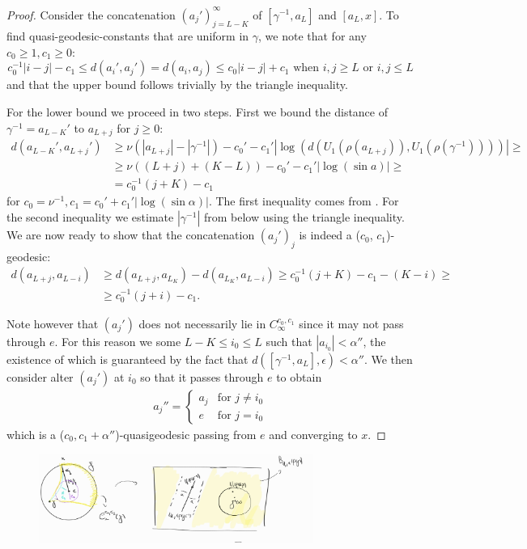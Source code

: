 \documentclass{report}
\begin{document}
\begin{proof}
    Consider the concatenation $(a_j')_{j=L-K}^\infty$ of $[\gamma^{-1},a_L]$ and $[a_L, x]$.
    To find quasi-geodesic-constants that are uniform in $\gamma$, we note that for any $c_0 \geq 1, c_1 \geq 0$:
    \[
        c_0^{-1} |i - j| - c_1 \leq d(a_i', a_j') = d(a_i, a_j) \leq c_0 |i - j| + c_1 
        \text{ when } i,j \geq L \text{ or } i,j \leq L
    \]
    and that the upper bound follows trivially by the triangle inequality. 
    
    For the lower bound we proceed in two steps. 
    First we bound the distance of $\gamma^{-1} = a_{L-K}'$ to $a_{L+j}$ for $j\geq 0$:
    \begin{align*}
        d(a_{L-K}', a_{L+j}') 
        &\geq \nu (|a_{L+j}| - |\gamma^{-1}|) - c_0' -c_1'|\log(d(U_1(\rho(a_{L+j})), U_1(\rho(\gamma^{-1}))))| \geq\\
        &\geq \nu((L+j) + (K-L)) - c_0' -c_1'|\log(\sin a)| \geq\\
        &= c_0^{-1} (j+K) - c_1
    \end{align*}
    for $c_0 = \nu^{-1}, c_1 = c_0' + c_1'|\log(\sin \alpha)|$.
    The first inequality comes from \cite[Lemma 3.9]{pozzetti_anosov_2023}. For the second inequality we estimate $|\gamma^{-1}|$ from below using the triangle inequality.
    We are now ready to show that the concatenation $(a_j')_j$ is indeed a ($c_0$, $c_1$)-geodesic:
    \begin{align*}
        d(a_{L+j}, a_{L-i}) &\geq d(a_{L+j},a_{L_K}) - d(a_{L_K}, a_{L-i}) \geq
        c_0^{-1} (j+K) - c_1 - (K - i) \geq\\
        &\geq c_0^{-1} (j+i) - c_1.
    \end{align*}

    Note however that $(a_j')$ does not necessarily lie in $C_\infty^{c_0, c_1}$ since it may not pass through $e$.
    For this reason we some $L - K \leq i_0\leq L$ such that $|a_{i_0}| < \alpha''$, the existence of which is guaranteed by the fact that $d([\gamma^{-1}, a_L], \epsilon) < \alpha''$.
    We then consider alter $(a_j')$ at $i_0$ so that it passes through $e$ to obtain 
    \begin{align*}
        a_j''=
        \begin{cases}
            a_j & \text{for } j\neq i_0 \\
            e & \text{for } j = i_0
        \end{cases}      
    \end{align*}
    which is a ($c_0, c_1 + \alpha''$)-quasigeodesic passing from $e$ and converging to $x$.
\end{proof}
\begin{figure}[h]
    \centering
    \includegraphics[width=0.8\textwidth]{cone.jpg}
\end{figure}
\end{document}
